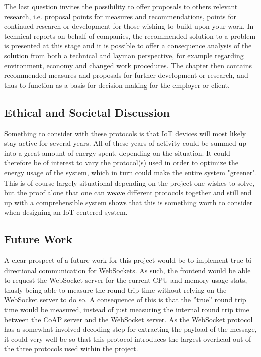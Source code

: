 The last question invites the possibility to offer proposals to others relevant research, i.e. proposal points for measures and recommendations, points for continued research or development for those wishing to build upon your work. In technical reports on behalf of companies, the recommended solution to a problem is presented at this stage and it is possible to offer a consequence analysis of the solution from both a technical and layman perspective, for example regarding environment, economy and changed work procedures. The chapter then contains recommended measures and proposals for further development or research, and thus to function as a basis for decision-making for the employer or client.
\fi

\subsection{Ethical and Societal Discussion}
\label{ch:concl:ethical}
Something to consider with these protocols is that IoT devices will most likely stay active for several years. All of these years of activity could be summed up into a great amount of energy spent, depending on the situation. It could therefore be of interest to vary the protocol(s) used in order to optimize the energy usage of the system, which in turn could make the entire system "greener". This is of course largely situational depending on the project one wishes to solve, but the proof alone that one can weave different protocols together and still end up with a comprehensible system shows that this is something worth to consider when designing an IoT-centered system. 

\subsection{Future Work}
\label{ch:concl:future-work}
A clear prospect of a future work for this project would be to implement true bi-directional communication for WebSockets. As such, the frontend would be able to request the WebSocket server for the current CPU and memory usage stats, thusly being able to measure the round-trip-time without relying on the WebSocket server to do so. A consequence of this is that the ''true'' round trip time would be measured, instead of just measuring the internal round trip time between the CoAP server and the WebSocket server. As the WebSocket protocol has a somewhat involved decoding step for extracting the payload of the message, it could very well be so that this protocol introduces the largest overhead out of the three protocols used within the project.
